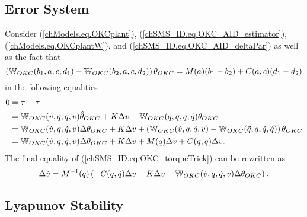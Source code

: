 \subsection{Error System}\label{chSMS_ID.sec.OKC_AID_error}

Consider (\ref{chModels.eq.OKCplant}),
(\ref{chSMS_ID.eq.OKC_AID_estimator}), (\ref{chModels.eq.OKCplantW}),
and (\ref{chSMS_ID.eq.OKC_AID_deltaPar}) as well as the fact that
%
\begin{equation*}
\left(\mathbb{W}_{OKC}(b_1,a,c,d_1)-\mathbb{W}_{OKC}(b_2,a,c,d_2)\right)\theta_{OKC}=M(a)(b_1-b_2)+C(a,c)(d_1-d_2)
\end{equation*}
%
in the following equalities
%
\begin{align}
  0&=\tau-\tau  \nonumber \\
  &=\mathbb{W}_{OKC}(\dot{v},q,\dot{q},v)\hat{\theta}_{OKC}
  + K\Delta v - \mathbb{W}_{OKC}(\ddot{q},q,\dot{q},\dot{q})\theta_{OKC} \nonumber \\
  &=\mathbb{W}_{OKC}(\dot{v},q,\dot{q},v)\Delta\theta_{OKC} + K\Delta v+\left(
    \mathbb{W}_{OKC}(\dot{v},q,\dot{q},v)
    - \mathbb{W}_{OKC}(\ddot{q},q,\dot{q},\dot{q})\right)\theta_{OKC}     \nonumber \\
  &=\mathbb{W}_{OKC}(\dot{v},q,\dot{q},v)\Delta\theta_{OKC} + K\Delta v +
  M(q)\Delta \dot{v}+C(q,\dot{q})\Delta v. 
  \label{chSMS_ID.eq.OKC_torqueTrick}
\end{align} 
%
The final equality of (\ref{chSMS_ID.eq.OKC_torqueTrick}) can be
rewritten as
%
\begin{equation}\label{chSMS_ID.eq.OKC_AID_deltaJointAcc}
\Delta\dot{v}=M^{-1}(q)\left(-C(q,\dot{q})\Delta v 
   -K\Delta v-\mathbb{W}_{OKC}(\dot{v},q,\dot{q},v)\Delta \theta_{OKC}\right).
\end{equation}

\subsection{Lyapunov Stability}\label{chSMS_ID.sec.OKC_AID_lyap}

